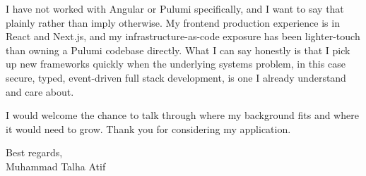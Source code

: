 \documentclass[10pt, letterpaper]{article}
\begin{document}
I have not worked with Angular or Pulumi specifically, and I want to say that plainly rather
than imply otherwise. My frontend production experience is in React and Next.js, and my
infrastructure-as-code exposure has been lighter-touch than owning a Pulumi codebase directly.
What I can say honestly is that I pick up new frameworks quickly when the underlying systems
problem, in this case secure, typed, event-driven full stack development, is one I already
understand and care about.

I would welcome the chance to talk through where my background fits and where it would need
to grow. Thank you for considering my application.

\vspace{10pt}

Best regards,\\
Muhammad Talha Atif
\end{document}
